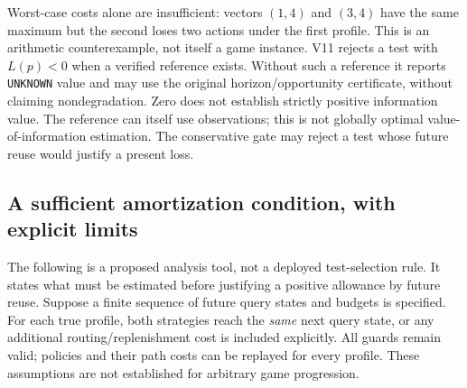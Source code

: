 \documentclass[11pt]{article}
\theoremstyle{definition}
\begin{document}
Worst-case costs alone are insufficient: vectors $(1,4)$ and $(3,4)$ have the
same maximum but the second loses two actions under the first profile. This is
an arithmetic counterexample, not itself a game instance. V11 rejects a test
with $L(p)<0$ when a verified reference exists. Without such a reference it
reports \texttt{UNKNOWN} value and may use the original horizon/opportunity
certificate, without claiming nondegradation. Zero does not establish strictly
positive information value. The reference can itself use observations; this
is not globally optimal value-of-information estimation. The conservative gate
may reject a test whose future reuse would justify a present loss.

\subsection{A sufficient amortization condition, with explicit limits}
The following is a proposed analysis tool, not a deployed test-selection rule.
It states what must be estimated before justifying a positive allowance by
future reuse. Suppose a finite sequence of future query states and budgets is
specified. For each true profile, both strategies reach the \emph{same} next
query state, or any additional routing/replenishment cost is included explicitly.
All guards remain valid; policies and their path costs can be replayed for every
profile. These assumptions are not established for arbitrary game progression.
\end{document}
